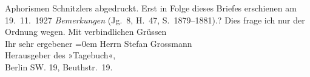 \begin{ledgroupsized}[t]{13cm}
{{{                        Aphorismen Schnitzlers abgedruckt. Erst
                        in Folge dieses Briefes erschienen am 19. 11. 1927{ }\emph{Bemerkungen} (Jg. 8, H. 47,
                            S. 1879–1881).}}}\label{K_L02492_1h}? Dies frage ich nur der Ordnung wegen.\pend
           \pstart
           Mit verbindlichen Grüssen{\\[\baselineskip]}Ihr sehr ergebener\pend
           \leftskip=0em{}{\bigskip}\pstart
           \noindent{}Herrn Stefan Grossmann{\\}Herausgeber des »Tagebuch«,{\\}Berlin SW. 19, Beuthstr. 19.\pend
           \endnumbering{}\end{ledgroupsized}  \newcommand{\dateiname}{L02492}\newcommand{\titel}{Arthur Schnitzler an Stefan Großmann, 7. 11. 1927}\newcommand{\editorInnen}{Martin Anton Müller und Gerd-Hermann Susen}
            \footnotesize
\begin{ledgroupsized}[t]{11.5cm}
\end{ledgroupsized}
         
      